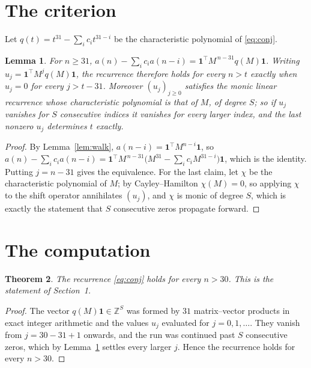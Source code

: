 \documentclass[11pt,a4paper]{article}
\theoremstyle{plain}
\newtheorem{theorem}{Theorem}
\newtheorem{lemma}[theorem]{Lemma}
\theoremstyle{definition}
\begin{document}
\section{The criterion}

Let $q(t)=t^{31}-\sum_i c_i t^{31-i}$ be the characteristic polynomial of
\eqref{eq:conj}.

\begin{lemma}\label{lem:crit}
For $n\ge31$,
$a(n)-\sum_i c_i a(n-i)=\mathbf{1}^{\!\top}M^{\,n-31}q(M)\mathbf{1}$. Writing
$u_j=\mathbf{1}^{\!\top}M^{j}q(M)\mathbf{1}$, the recurrence therefore holds for every
$n>t$ exactly when $u_j=0$ for every $j>t-31$. Moreover $(u_j)_{j\ge0}$ satisfies the
monic linear recurrence whose characteristic polynomial is that of $M$, of degree $S$; so
if $u_j$ vanishes for $S$ consecutive indices it vanishes for every larger index, and the
last nonzero $u_j$ determines $t$ exactly.
\end{lemma}

\begin{proof}
By Lemma~\ref{lem:walk}, $a(n-i)=\mathbf{1}^{\!\top}M^{n-i}\mathbf{1}$, so
$a(n)-\sum_i c_i a(n-i)
=\mathbf{1}^{\!\top}M^{\,n-31}\bigl(M^{31}-\sum_i c_i M^{31-i}\bigr)
\mathbf{1}$, which is the identity. Putting $j=n-31$ gives the equivalence. For the
last claim, let $\chi$ be the characteristic polynomial of $M$; by Cayley--Hamilton
$\chi(M)=0$, so applying $\chi$ to the shift operator annihilates $(u_j)$, and $\chi$ is
monic of degree $S$, which is exactly the statement that $S$ consecutive zeros propagate
forward.
\end{proof}

\section{The computation}

\begin{theorem}
The recurrence \eqref{eq:conj} holds for every $n>30$. This is the statement of
Section~1.
\end{theorem}

\begin{proof}
The vector $q(M)\mathbf{1}\in\mathbb{Z}^{S}$ was formed by $31$ matrix--vector
products in exact integer arithmetic and the values $u_j$ evaluated for
$j=0,1,\dots$. They vanish from $j=30-31+1$ onwards, and the run was continued past
$S$ consecutive zeros, which by Lemma~\ref{lem:crit} settles every larger $j$. Hence the
recurrence holds for every $n>30$.
\end{proof}
\end{document}
